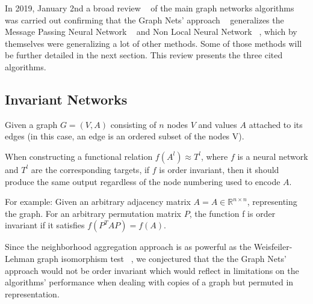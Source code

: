 In 2019, January 2nd a broad review ~\cite{Zhou_2019} of the main graph networks algorithms was carried out confirming that the Graph Nets’ approach ~\cite{Battaglia_2018} generalizes the Message Passing Neural Network ~\cite{Gilmer_2017} and Non Local Neural Network ~\cite{Wang_2018}, which by themselves were generalizing a lot of other methods. Some of those methods will be further detailed in the next section. This review presents the three cited algorithms. 


\subsection{Invariant Networks}

Given a graph $G = (V, A)$ consisting of $n$ nodes $V$ and values $A$ attached to its edges (in this case, an edge is an ordered subset of the nodes V).

When constructing a functional relation $f(A^l) \approx T^l$, where $f$ is a neural network and $T^l$ are the corresponding targets, if $f$ is order invariant, then it should produce the same output regardless of the node numbering used to encode $A$.

For example: Given an arbitrary adjacency matrix $A = A \in \mathds{R}^{n \times n}$, representing the graph. For an arbitrary permutation matrix $P$, the function f is order invariant if it satisfies $f(P^T A P) = f(A)$.

Since the neighborhood aggregation approach is as powerful as the Weisfeiler-Lehman graph isomorphism test ~\cite{Xu_2018}, we conjectured that the the Graph Nets’ approach would not be order invariant which would reflect in limitations on the algorithms’ performance when dealing with copies of a graph but permuted in representation. 
